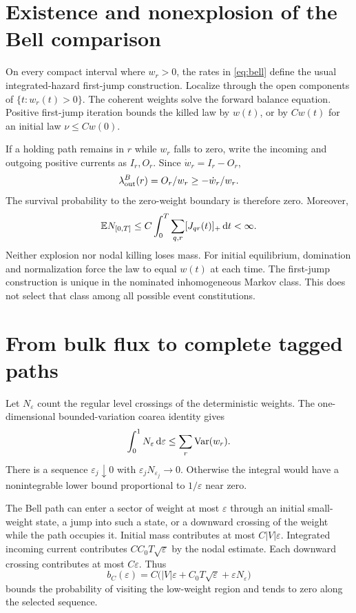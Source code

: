 \section{Existence and nonexplosion of the Bell comparison}\label{section:kinetic:existence-and-nonexplosion-of-the-bell-comparison}
On every compact interval where $w_r>0$, the rates in \cref{eq:bell} define the usual integrated-hazard first-jump construction. Localize through the open components of $\{t:w_r(t)>0\}$. The coherent weights solve the forward balance equation. Positive first-jump iteration bounds the killed law by $w(t)$, or by $Cw(t)$ for an initial law $\nu\le Cw(0)$.

If a holding path remains in $r$ while $w_r$ falls to zero, write the incoming and outgoing positive currents as $I_r,O_r$. Since $\dot w_r=I_r-O_r$,
\[
\lambda^B_{\rm out}(r)=O_r/w_r\ge-\dot w_r/w_r.
\]
The survival probability to the zero-weight boundary is therefore zero. Moreover,
\[
\mathbb E N_{[0,T]}\le C\int_0^T\sum_{q,r}[J_{qr}(t)]_+\,\mathrm d t<\infty.
\]
Neither explosion nor nodal killing loses mass. For initial equilibrium, domination and normalization force the law to equal $w(t)$ at each time. The first-jump construction is unique in the nominated inhomogeneous Markov class. This does not select that class among all possible event constitutions.

\section{From bulk flux to complete tagged paths}\label{section:kinetic:from-bulk-flux-to-complete-tagged-paths}
Let $N_\varepsilon$ count the regular level crossings of the deterministic weights. The one-dimensional bounded-variation coarea identity gives
\[
\int_0^1N_\varepsilon\,\mathrm d\varepsilon\le\sum_r\operatorname{Var}(w_r).
\]
There is a sequence $\varepsilon_j\downarrow0$ with $\varepsilon_jN_{\varepsilon_j}\to0$. Otherwise the integral would have a nonintegrable lower bound proportional to $1/\varepsilon$ near zero.

The Bell path can enter a sector of weight at most $\varepsilon$ through an initial small-weight state, a jump into such a state, or a downward crossing of the weight while the path occupies it. Initial mass contributes at most $C|V|\varepsilon$. Integrated incoming current contributes $CC_0T\sqrt\varepsilon$ by the nodal estimate. Each downward crossing contributes at most $C\varepsilon$. Thus
\[
b_C(\varepsilon)=C\bigl(|V|\varepsilon+C_0T\sqrt\varepsilon+
\varepsilon N_\varepsilon\bigr)
\]
bounds the probability of visiting the low-weight region and tends to zero along the selected sequence.

